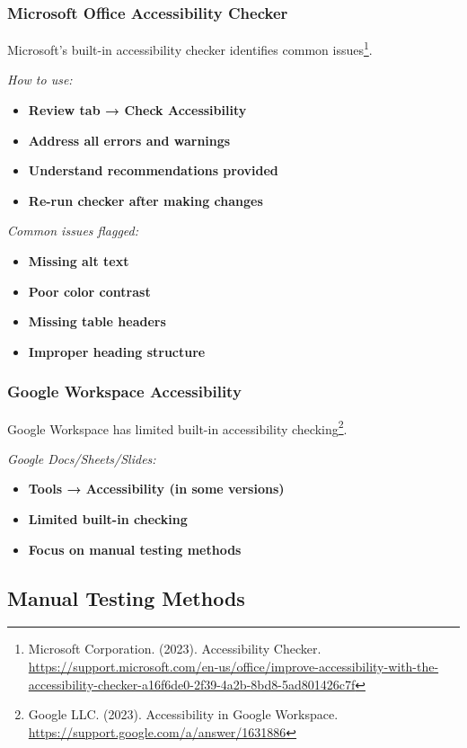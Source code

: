 \subsubsection{Microsoft Office Accessibility Checker}
Microsoft's built-in accessibility checker identifies common issues\footnote{Microsoft Corporation. (2023). Accessibility Checker. \url{https://support.microsoft.com/en-us/office/improve-accessibility-with-the-accessibility-checker-a16f6de0-2f39-4a2b-8bd8-5ad801426c7f}}.

\emph{How to use:}
\begin{itemize}
\item \textbf{Review tab → Check Accessibility}
\item \textbf{Address all errors and warnings}
\item \textbf{Understand recommendations provided}
\item \textbf{Re-run checker after making changes}
\end{itemize}

\emph{Common issues flagged:}
\begin{itemize}
\item \textbf{Missing alt text}
\item \textbf{Poor color contrast}
\item \textbf{Missing table headers}
\item \textbf{Improper heading structure}
\end{itemize}

\subsubsection{Google Workspace Accessibility}
Google Workspace has limited built-in accessibility checking\footnote{Google LLC. (2023). Accessibility in Google Workspace. \url{https://support.google.com/a/answer/1631886}}.

\emph{Google Docs/Sheets/Slides:}
\begin{itemize}
\item \textbf{Tools → Accessibility (in some versions)}
\item \textbf{Limited built-in checking}
\item \textbf{Focus on manual testing methods}
\end{itemize}

\subsection{Manual Testing Methods}

